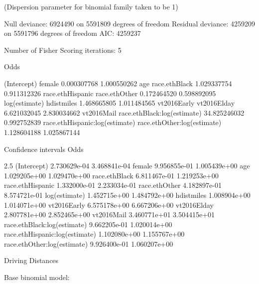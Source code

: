 (Dispersion parameter for binomial family taken to be 1)

    Null deviance: 6924490  on 5591809  degrees of freedom
Residual deviance: 4259209  on 5591796  degrees of freedom
AIC: 4259237

Number of Fisher Scoring iterations: 5


Odds

(Intercept)                         female
0.000307768                    1.000550262
        age                  race.ethBlack
1.029337754                    0.911312326
race.ethHispanic                  race.ethOther
0.172464520                    0.598892095
log(estimate)                     hdistmiles
1.468665805                    1.011484565
vt2016Early                    vt2016Elday
6.621032045                    2.830034662
 vt2016Mail    race.ethBlack:log(estimate)
34.825246032                    0.992752839
race.ethHispanic:log(estimate)    race.ethOther:log(estimate)
1.128604188                    1.025867144



Confidence intervals Odds

2.5 %
(Intercept)                    2.730629e-04 3.468841e-04
female                         9.956855e-01 1.005439e+00
age                            1.029205e+00 1.029470e+00
race.ethBlack                  6.811467e-01 1.219253e+00
race.ethHispanic               1.332000e-01 2.233034e-01
race.ethOther                  4.182897e-01 8.574721e-01
log(estimate)                  1.452715e+00 1.484792e+00
hdistmiles                     1.008904e+00 1.014071e+00
vt2016Early                    6.575178e+00 6.667206e+00
vt2016Elday                    2.807781e+00 2.852465e+00
vt2016Mail                     3.460771e+01 3.504415e+01
race.ethBlack:log(estimate)    9.662205e-01 1.020014e+00
race.ethHispanic:log(estimate) 1.102080e+00 1.155767e+00
race.ethOther:log(estimate)    9.926400e-01 1.060207e+00

























Driving Distances

Base binomial model:

